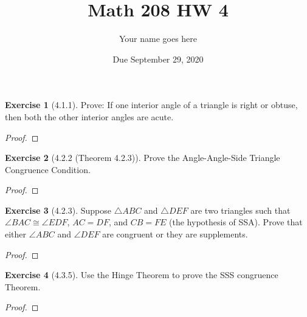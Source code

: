 \documentclass[12pt]{article}		%
\title{Math 208 HW 4}
\author{Your name goes here}
\date{Due September 29, 2020}
\theoremstyle{definition}
\newtheorem*{ex}{Exercise}
\begin{document}
	\maketitle
	
	


\begin{ex}[4.1.1]
	Prove: If one interior angle of a triangle is right or obtuse, then both the other interior angles are acute.
\end{ex}

\begin{proof} 
	
\end{proof}

\vspace{1in} %






\begin{ex}[4.2.2 (Theorem 4.2.3)]
	Prove the Angle-Angle-Side Triangle Congruence Condition.
\end{ex}

\begin{proof} 
	
\end{proof}

\vspace{1in} %





\begin{ex}[4.2.3]
	Suppose $\triangle ABC$ and $\triangle DEF$ are two triangles such that $\angle BAC \cong \angle EDF$, $AC = DF$, and $CB = FE$ (the hypothesis of SSA).  Prove that either $\angle ABC$ and $\angle DEF$ are congruent or they are supplements. 
\end{ex}

\begin{proof} 
	
\end{proof}


\vspace{1in} %






\begin{ex}[4.3.5]
Use the Hinge Theorem to prove the SSS congruence Theorem.

\end{ex}

\begin{proof} 
	
\end{proof}


\vspace{1in} %







	
	
	
\end{document}
